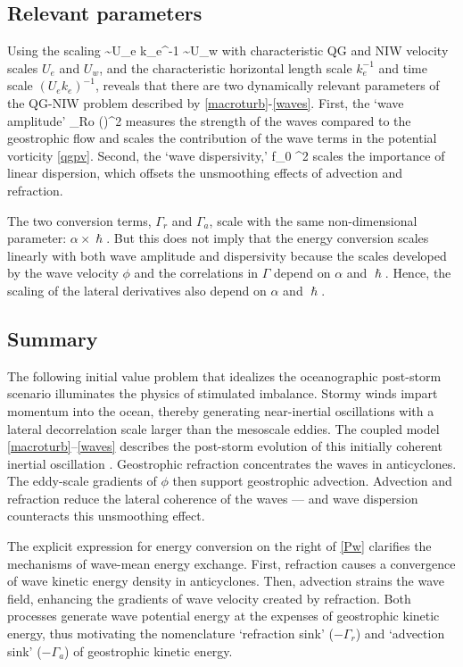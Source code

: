 \documentclass{jfm}
\begin{document}
\subsection{Relevant parameters}
Using the scaling
\beq
\psi \sim U_e k_e^{-1} \com\qquad {} \qquad \phi \sim U_w\com
\eeq
with characteristic QG and NIW velocity scales $U_e$ and $U_w$, and the
characteristic horizontal length scale $k_e^{-1}$ and time scale $(U_e k_e)^{-1}$,
reveals that there are two dynamically relevant parameters of the QG-NIW problem
described by \eqref{macroturb}-\eqref{waves}. First, the `wave amplitude'
\beq
\label{alpha}
\alpha {} {}_{ Ro} \times
{\left(\right)^2}\com
\eeq
measures the strength of the waves compared to the geostrophic flow and scales
the contribution of the wave terms in the potential vorticity \eqref{qgpv}.
Second, the `wave dispersivity,'
\beq
\label{hslash}
\hslash {} f_0 \lambda^2 \times {}\com
\eeq
scales the importance of linear dispersion, which offsets the unsmoothing
effects of advection and refraction.

The two conversion terms, $\Gamma_r$ and $\Gamma_a$,
scale with the same non-dimensional parameter: $\alpha\times \hslash$. But this
does not imply that the energy conversion scales linearly with both wave amplitude
and dispersivity because the scales developed by the wave velocity $\phi$ and the
 correlations in $\Gamma$ depend on $\alpha$ and $\hslash$. Hence, the scaling of
 the lateral derivatives also depend on $\alpha$ and $\hslash$.


\subsection{Summary}
The following initial value problem that idealizes the oceanographic post-storm scenario
illuminates the physics of stimulated imbalance. Stormy winds impart momentum
into the ocean, thereby generating near-inertial oscillations with a lateral
decorrelation scale larger than the mesoscale eddies. The coupled model
\eqref{macroturb}--\eqref{waves} describes the post-storm evolution
of this initially coherent inertial oscillation
 \citep{xie_vanneste2015}. Geostrophic refraction
concentrates the waves in anticyclones. The eddy-scale gradients of $\phi$ then support
geostrophic advection. Advection and refraction reduce the lateral coherence
of the waves --- and wave dispersion counteracts this unsmoothing effect.

The explicit expression for energy
conversion on the right of \eqref{Pw} clarifies the mechanisms of wave-mean energy
exchange. First, refraction causes a convergence of wave kinetic energy density in
anticyclones. Then, advection strains the wave field, enhancing the gradients of
wave velocity created by refraction. Both
processes generate wave potential energy at the expenses of geostrophic kinetic
energy, thus motivating the nomenclature `refraction sink' ($-\Gamma_r$) and
`advection sink' ($-\Gamma_a$)  of geostrophic kinetic energy.
\end{document}
